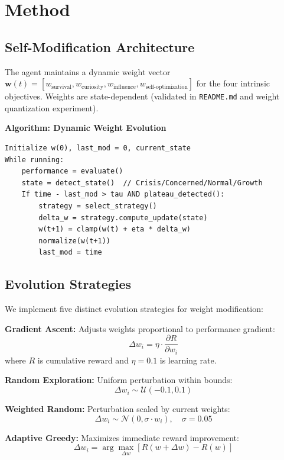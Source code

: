 \documentclass{article}
\begin{document}
\section{Method}

\subsection{Self-Modification Architecture}
The agent maintains a dynamic weight vector $\mathbf{w}(t) = [w_{\text{survival}}, w_{\text{curiosity}}, w_{\text{influence}}, w_{\text{self-optimization}}]$ for the four intrinsic objectives. Weights are state-dependent (validated in \texttt{README.md} and weight quantization experiment).

\textbf{Algorithm: Dynamic Weight Evolution}
\begin{verbatim}
Initialize w(0), last_mod = 0, current_state
While running:
    performance = evaluate()
    state = detect_state()  // Crisis/Concerned/Normal/Growth
    If time - last_mod > tau AND plateau_detected():
        strategy = select_strategy()
        delta_w = strategy.compute_update(state)
        w(t+1) = clamp(w(t) + eta * delta_w)
        normalize(w(t+1))
        last_mod = time
\end{verbatim}

\subsection{Evolution Strategies}
We implement five distinct evolution strategies for weight modification:

\textbf{Gradient Ascent:} Adjusts weights proportional to performance gradient:
\begin{equation}
\Delta w_i = \eta \cdot \frac{\partial R}{\partial w_i}
\end{equation}
where $R$ is cumulative reward and $\eta = 0.1$ is learning rate.

\textbf{Random Exploration:} Uniform perturbation within bounds:
\begin{equation}
\Delta w_i \sim \mathcal{U}(-0.1, 0.1)
\end{equation}

\textbf{Weighted Random:} Perturbation scaled by current weights:
\begin{equation}
\Delta w_i \sim \mathcal{N}(0, \sigma \cdot w_i), \quad \sigma = 0.05
\end{equation}

\textbf{Adaptive Greedy:} Maximizes immediate reward improvement:
\begin{equation}
\Delta w_i = \arg\max_{\Delta w} [R(w + \Delta w) - R(w)]
\end{equation}
\end{document}
